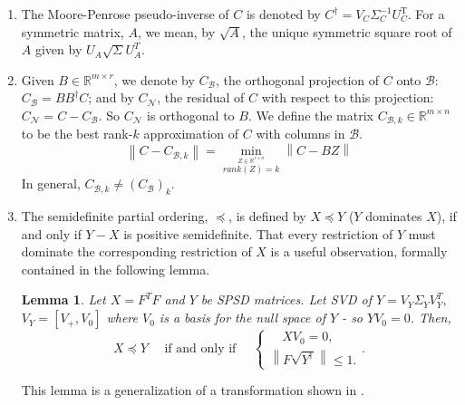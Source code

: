 \documentclass[11pt]{article}
\newtheorem{lemma}[theorem]{Lemma}
\renewcommand{\math}[1]{$#1$}
\def\reals{\mathbb{R}}
\newcommand{\norm}[1]{\left\|#1\right\|}
\newcommand{\Leq}{\preceq}
\newcommand{\B}{\mathcal{B}}
\newcommand{\N}{\mathcal{N}}
\begin{document}
\begin{enumerate}
\item The Moore-Penrose pseudo-inverse of $C$ is denoted by $C^{\dagger} = V_C\Sigma_C^{-1}U_C^{\text{T}}$. For a symmetric matrix, $A$, we mean, by $\sqrt{A}$, the unique symmetric square root of $A$ given by $U_A \sqrt{\Sigma} U_A ^T$. 

\item Given $B \in \reals^{m \times r}$, we denote by $C_{\B}$, the orthogonal projection of $C$ onto $\B$: $C_{\B} = BB^{\dagger}C$; and by $C_{\N}$, the residual of $C$ with respect to this projection: $C_{\N} = C - C_{\B}$. So $C_{\N}$ is orthogonal to $B$. 
We define the matrix $C_{\B,k} \in \reals^{m \times n}$ to be the best rank-$k$ approximation of ${C}$ with columns in $\B$. 
\[\norm{C - C_{\B,k}} = \min_{\stackrel{Z \in \reals^{r \times n}}{rank(Z) = k}} \norm{C - BZ}\]
In general, $C_{\B,k} \neq (C_{\B})_k$. 

\item The semidefinite partial ordering, $\Leq$, is defined by $X \Leq Y$ ($Y$ dominates $X$), if and only if $Y - X$ is positive semidefinite. That every restriction of $Y$ must dominate the corresponding restriction of $X$ is a useful observation, formally contained in the following lemma.
\begin{lemma}\label{basic lemma}
Let $X = F^TF$ and  $Y$ be SPSD matrices. Let SVD of $Y = V_Y\Sigma_Y V_Y^T,$ $V_Y = [V_+, V_0]$ where $V_0$ is a basis for the null space of 
$Y$ - so \math{YV_0=0}. Then, 
\[X \Leq Y \quad \text{  if and only if } \quad
\begin{cases}
\quad XV_0 = 0, \\[3pt]
\norm{F \sqrt{Y^{\dagger}} } \leq 1.
\end{cases}.
\]
\end{lemma}
\noindent This lemma is a generalization of a transformation shown in \cite{SR}.
\end{enumerate}
\end{document}
